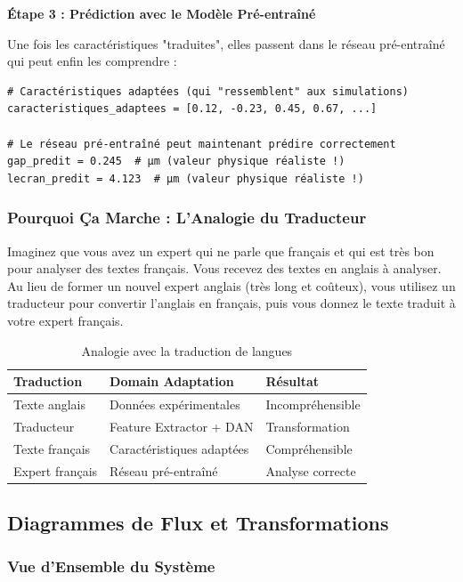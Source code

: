 \documentclass[twocolumn,10pt]{article}
\begin{document}
\textbf{Étape 3 : Prédiction avec le Modèle Pré-entraîné}

Une fois les caractéristiques "traduites", elles passent dans le réseau pré-entraîné qui peut enfin les comprendre :

\begin{lstlisting}[style=python, caption=Prédiction finale avec caractéristiques adaptées]
# Caractéristiques adaptées (qui "ressemblent" aux simulations)
caracteristiques_adaptees = [0.12, -0.23, 0.45, 0.67, ...]

# Le réseau pré-entraîné peut maintenant prédire correctement
gap_predit = 0.245  # µm (valeur physique réaliste !)
lecran_predit = 4.123  # µm (valeur physique réaliste !)
\end{lstlisting}

\subsubsection{Pourquoi Ça Marche : L'Analogie du Traducteur}

Imaginez que vous avez un expert qui ne parle que français et qui est très bon pour analyser des textes français. Vous recevez des textes en anglais à analyser. Au lieu de former un nouvel expert anglais (très long et coûteux), vous utilisez un traducteur pour convertir l'anglais en français, puis vous donnez le texte traduit à votre expert français.

\begin{table}[H]
\centering
\caption{Analogie avec la traduction de langues}
\begin{tabular}{|l|l|l|}
\hline
\textbf{Traduction} & \textbf{Domain Adaptation} & \textbf{Résultat} \\
\hline
Texte anglais & Données expérimentales & Incompréhensible \\
Traducteur & Feature Extractor + DAN & Transformation \\
Texte français & Caractéristiques adaptées & Compréhensible \\
Expert français & Réseau pré-entraîné & Analyse correcte \\
\hline
\end{tabular}
\end{table}

\subsection{Diagrammes de Flux et Transformations}

\subsubsection{Vue d'Ensemble du Système}
\end{document}
